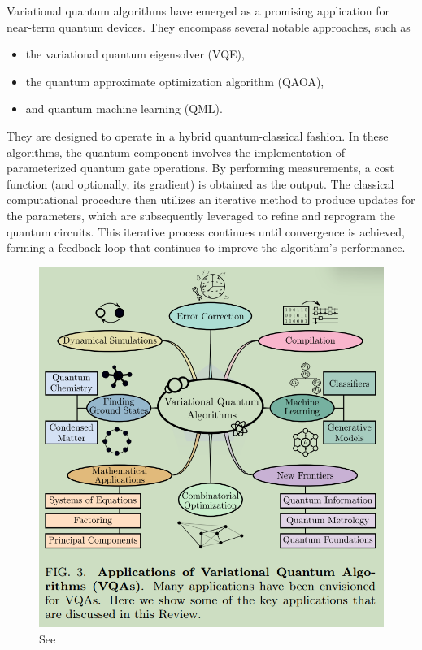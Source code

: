 \documentclass[
        11pt, %
	a4paper, %
]{LegrandOrangeBook}
\begin{document}
Variational quantum algorithms have emerged as a promising application for near-term quantum devices. They encompass several notable approaches, such as 
\begin{itemize}
    \item the variational quantum eigensolver (VQE),
    \item the quantum approximate optimization algorithm (QAOA),
    \item and quantum machine learning (QML).
\end{itemize}
They are designed to operate in a hybrid quantum-classical fashion. In these algorithms, the quantum component involves the implementation of parameterized quantum gate operations. By performing measurements, a cost function (and optionally, its gradient) is obtained as the output. The classical computational procedure then utilizes an iterative method to produce updates for the parameters, which are subsequently leveraged to refine and reprogram the quantum circuits. This iterative process continues until convergence is achieved, forming a feedback loop that continues to improve the algorithm's performance.

\begin{figure}
    \centering
    \includegraphics[width=1\linewidth]{apps-of-vqa.png}
    \caption{See \cite{cerezo2021variational}}
\end{figure}
\end{document}
